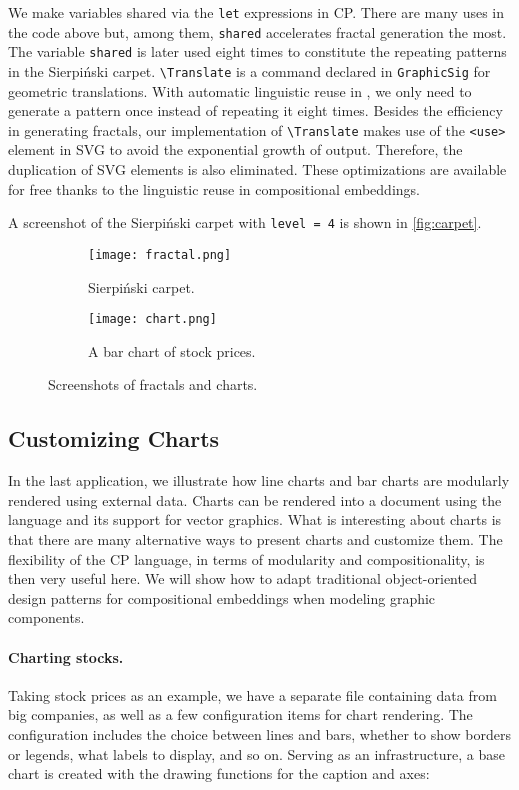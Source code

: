\noindent We make variables shared via the \lstinline{let} expressions in CP.
There are many uses in the code above but, among them, \lstinline{shared}
accelerates fractal generation the most. The variable \lstinline{shared} is
later used eight times to constitute the repeating patterns in the Sierpiński
carpet. \lstinline{\Translate} is a command declared in \lstinline{GraphicSig}
for geometric translations. With automatic linguistic reuse in \ExT, we only
need to generate a pattern once instead of repeating it eight times. Besides the
efficiency in generating fractals, our implementation of \lstinline{\Translate}
makes use of the \lstinline{<use>} element in SVG to avoid the exponential
growth of output. Therefore, the duplication of SVG elements is also eliminated.
These optimizations are available for free thanks to the linguistic reuse in
compositional embeddings.

A screenshot of the Sierpiński carpet with \lstinline{level = 4} is shown in
\autoref{fig:carpet}.

\begin{figure}
\begin{subfigure}{.4\textwidth}
\centering
\texttt{[image: fractal.png]}
\caption{Sierpiński carpet.}
\label{fig:carpet}
\end{subfigure}%
\begin{subfigure}{.6\textwidth}
\centering
\texttt{[image: chart.png]}
\caption{A bar chart of stock prices.}
\label{fig:chart}
\end{subfigure}
\caption{Screenshots of fractals and charts.}
\end{figure}

\subsection{Customizing Charts} \label{sec:charts}

In the last application, we illustrate how line charts and bar charts are
modularly rendered using external data. Charts can be rendered into a document
using the \ExT language and its support for vector graphics. What is interesting
about charts is that there are many alternative ways to present charts and
customize them. The flexibility of the CP language, in terms of modularity and
compositionality, is then very useful here. We will show how to adapt
traditional object-oriented design patterns for compositional embeddings when
modeling graphic components.

\paragraph{Charting stocks.}
Taking stock prices as an example, we have a separate file containing data from
big companies, as well as a few configuration items for chart rendering. The
configuration includes the choice between lines and bars, whether to show
borders or legends, what labels to display, and so on. Serving as an
infrastructure, a base chart is created with the drawing functions for the
caption and axes:

